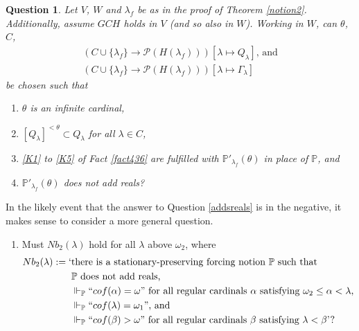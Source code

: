 \documentclass[12pt, twoside]{memoir}
\numberwithin{equation}{section}
\newtheorem{ques}[thm]{Question}
\theoremstyle{definition}
\theoremstyle{remark}
\theoremstyle{definition}
\theoremstyle{definition}
\theoremstyle{definition}
\theoremstyle{remark}
\begin{document}
\begin{ques}\label{addsreals2}
Let $V$, $W$ and $\lambda_f$ be as in the proof of Theorem \ref{notion2}. Additionally, assume $GCH$ holds in $V$ (and so also in $W$). Working in  $W$, can $\theta$, $C$, 
\begin{gather*}
    (C \cup \{\lambda_f\} \longrightarrow \mathcal{P}(H(\lambda_f))) [\lambda \mapsto Q_{\lambda}] \text{, and} \\
    (C \cup \{\lambda_f\} \longrightarrow \mathcal{P}(H(\lambda_f))) [\lambda \mapsto \Gamma_{\lambda}]
\end{gather*}
be chosen such that
\begin{enumerate}[label=(\arabic*)]
    \item $\theta$ is an infinite cardinal,
    \item $[Q_{\lambda}]^{< \theta} \subset Q_{\lambda}$ for all $\lambda \in C$,
    \item \ref{K1} to \ref{K5} of Fact \ref{fact436} are fulfilled with $\mathbb{P}'_{\lambda_f}(\theta)$ in place of $\mathbb{P}$, and
    \item $\mathbb{P}'_{\lambda_f}(\theta)$ does not add reals?
\end{enumerate}
\end{ques}

In the likely event that the answer to Question \ref{addsreals} is in the negative, it makes sense to consider a more general question.

\begin{enumerate}[label=(Q\arabic*)]
    \item Must $Nb_2(\lambda)$ hold for all $\lambda$ above $\omega_2$, where 
    \begin{align*}
        Nb_2(\lambda) := \text{`} & \text{there is a stationary-preserving forcing notion } \mathbb{P} \text{ such that} \\ 
        & \mathbb{P} \text{ does not add reals,} \\
        & \Vdash_{\mathbb{P}} ``cof(\alpha) = \omega" \text{ for all regular cardinals } \alpha \text{ satisfying } \omega_2 \leq \alpha < \lambda \text{,} \\
        & \Vdash_{\mathbb{P}} ``cof(\lambda) = \omega_1" \text{, and} \\
        & \Vdash_{\mathbb{P}} ``cof(\beta) > \omega" \text{ for all regular cardinals } \beta \text{ satisfying } \lambda < \beta \text{'?}
\end{align*}
\end{enumerate}
\end{document}
